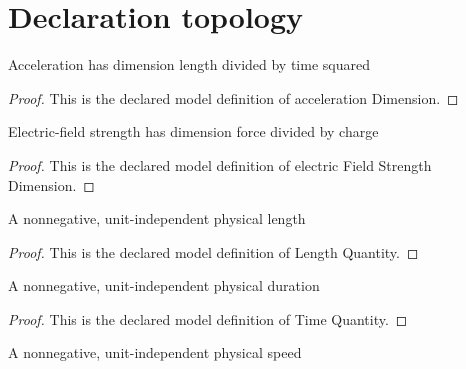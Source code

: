 \section{Declaration topology}
\begin{definition}
  \label{def:physics:phyx-mini-0836:phyxminiproblems-problemphyxmini0836-accelerationdimension}
  Acceleration has dimension length divided by time squared
\end{definition}
\begin{proof}
  This is the declared model definition of acceleration Dimension.
\end{proof}
\begin{definition}
  \label{def:physics:phyx-mini-0836:phyxminiproblems-problemphyxmini0836-electricfieldstrengthdimension}
  Electric-field strength has dimension force divided by charge
\end{definition}
\begin{proof}
  This is the declared model definition of electric Field Strength Dimension.
\end{proof}
\begin{definition}
  \label{def:physics:phyx-mini-0836:phyxminiproblems-problemphyxmini0836-lengthquantity}
  A nonnegative, unit-independent physical length
\end{definition}
\begin{proof}
  This is the declared model definition of Length Quantity.
\end{proof}
\begin{definition}
  \label{def:physics:phyx-mini-0836:phyxminiproblems-problemphyxmini0836-timequantity}
  A nonnegative, unit-independent physical duration
\end{definition}
\begin{proof}
  This is the declared model definition of Time Quantity.
\end{proof}
\begin{definition}
  \label{def:physics:phyx-mini-0836:phyxminiproblems-problemphyxmini0836-speedquantity}
  A nonnegative, unit-independent physical speed
\end{definition}
